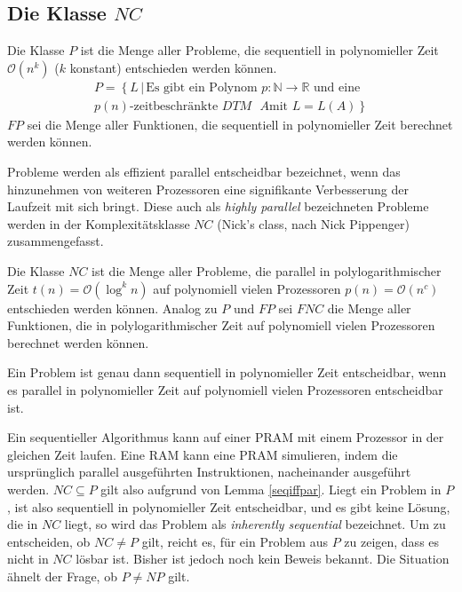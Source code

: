 \subsection{Die Klasse $NC$}
\begin{define}
    Die Klasse $P$ ist die Menge aller Probleme, die sequentiell in 
    polynomieller Zeit $\mathcal{O}(n^k)$ ($k$ konstant) entschieden werden
    können.
    \begin{equation}
        \begin{split}
            P = \left\{ L \, | \, \text{Es gibt ein Polynom }
            p\colon \mathbb{N} \to \mathbb{R} \right.
            \text{ und eine} \\ \left. \text{$p(n)$-zeitbeschränkte $DTM$ $A$
            mit } L = L(A) \right\}
        \end{split}
    \end{equation}
    $FP$ sei die Menge aller Funktionen, die sequentiell in polynomieller Zeit
    berechnet werden können.
    \cite[S.205]{fgi1}\cite[S.44f]{greenlaw}
\end{define}
%
Probleme werden als effizient parallel entscheidbar bezeichnet, wenn das
hinzunehmen von weiteren Prozessoren eine signifikante Verbesserung der
Laufzeit mit sich bringt.
Diese auch als \emph{highly parallel} bezeichneten Probleme werden in der
Komplexitätsklasse $NC$ (Nick's class, nach Nick Pippenger) zusammengefasst.
%
\begin{define}
    Die Klasse $NC$ ist die Menge aller Probleme, die parallel in
    polylogarithmischer Zeit $t(n) = \mathcal{O}(\log^k n)$ auf polynomiell
    vielen Prozessoren $p(n) = \mathcal{O}(n^c)$ entschieden werden können.
    Analog zu $P$ und $FP$ sei $FNC$ die Menge aller Funktionen, die in
    polylogarithmischer Zeit auf polynomiell vielen Prozessoren berechnet
    werden können.
    \cite[S.44f]{greenlaw}
\end{define}
%
\begin{lemma}
    Ein Problem ist genau dann sequentiell in polynomieller Zeit entscheidbar,
    wenn es parallel in polynomieller Zeit auf polynomiell vielen Prozessoren
    entscheidbar ist.\cite[S.44]{greenlaw}
    \label{seqiffpar}
\end{lemma}
%
Ein sequentieller Algorithmus kann auf einer PRAM mit einem Prozessor in der
gleichen Zeit laufen.
Eine RAM kann eine PRAM simulieren, indem die ursprünglich parallel
ausgeführten Instruktionen, nacheinander ausgeführt werden.
$NC \subseteq P$ gilt also aufgrund von Lemma \ref{seqiffpar}.
%
Liegt ein Problem in $P$, ist also sequentiell in polynomieller Zeit
entscheidbar, und es gibt keine Lösung, die in $NC$ liegt, so wird das
Problem als \emph{inherently sequential} bezeichnet.
Um zu entscheiden, ob $NC \neq P$ gilt, reicht es, für ein Problem aus $P$ zu
zeigen, dass es nicht in $NC$ lösbar ist.
Bisher ist jedoch noch kein Beweis bekannt.
Die Situation ähnelt der Frage, ob $P \neq NP$ gilt.

